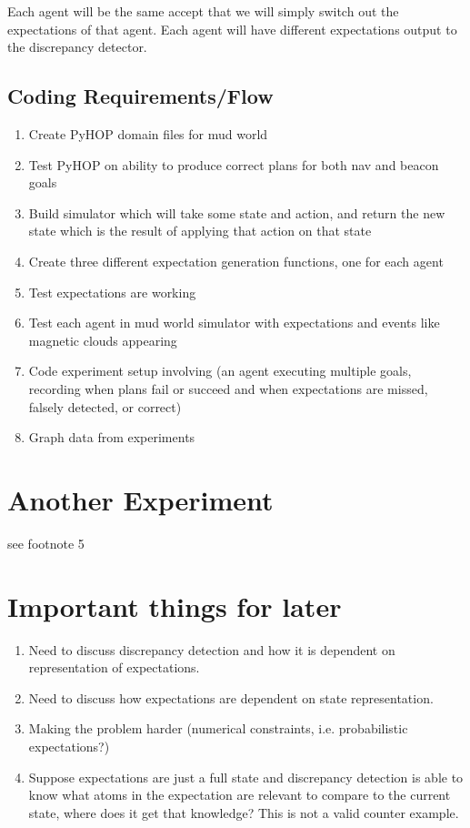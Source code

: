 \documentclass{article}
\begin{document}
Each agent will be the same accept that we will simply switch out the
expectations of that agent. Each agent will have different
expectations output to the discrepancy detector.


\subsection{Coding Requirements/Flow}
\begin{enumerate}
\item Create PyHOP domain files for mud world
\item Test PyHOP on ability to produce correct plans for both nav and beacon goals
\item Build simulator which will take some state and action, and return the new state which is the result of applying that action on that state
\item Create three different expectation generation functions, one for each agent
\item Test expectations are working
\item Test each agent in mud world simulator with expectations and events like magnetic clouds appearing
\item Code experiment setup involving (an agent executing multiple goals, recording when plans fail or succeed and when expectations are missed, falsely detected, or correct)
\item Graph data from experiments
\end{enumerate}

\section{Another Experiment}
see footnote 5

\section{Important things for later}
\begin{enumerate}
\item Need to discuss discrepancy detection and how it is dependent on representation of expectations.
\item Need to discuss how expectations are dependent on state representation.
\item Making the problem harder (numerical constraints, i.e. probabilistic expectations?)
\item Suppose expectations are just a full state and discrepancy detection is able to know what atoms in the expectation are relevant to compare to the current state, where does it get that knowledge? This is not a valid counter example.
\end{enumerate}
\end{document}
